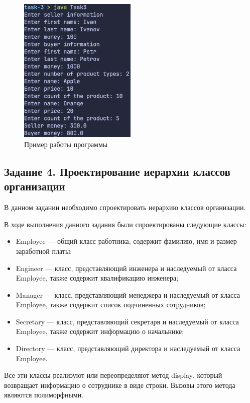 \documentclass[a4paper, 14pt]{extarticle}
\begin{document}
\begin{figure}[H]
  \centering
  \includegraphics[width=0.5\textwidth]{images/task-3.png}
  \caption{Пример работы программы}
  \label{fig:task-3-2}
\end{figure}

\subsection*{Задание 4. Проектирование иерархии классов организации}

В данном задании необходимо спроектировать иерархию классов организации.

В ходе выполнения данного задания были спроектированы следующие классы:
\begin{itemize}
  \item Employee --- общий класс работника, содержит фамилию, имя и размер
  заработной платы;
  \item Engineer --- класс, представляющий инженера и наследуемый от класса
  Employee, также содержит квалификацию инженера;
  \item Manager --- класс, представляющий менеджера и наследуемый от класса
  Employee, также содержит список подчиненных сотрудников;
  \item Secretary --- класс, представляющий секретаря и наследуемый от класса
  Employee, также содержит информацию о начальнике;
  \item Directory --- класс, представляющий директора и наследуемый от класса
  Employee.
\end{itemize}

Все эти классы реализуют или переопределяют метод
\foreignlanguage{english}{display}, который возвращает информацию о сотруднике в
виде строки. Вызовы этого метода являются полиморфными.
\end{document}
